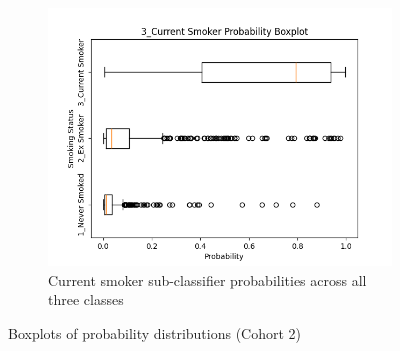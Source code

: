 \documentclass{article}
\begin{document}
\begin{figure}
    \begin{subfigure}{0.48\textwidth}
        \centering
        \includegraphics[width=\linewidth]{cohort2_3_boxplot.png}
        \caption{Current smoker sub-classifier probabilities across all three classes}
    \end{subfigure}
    \caption{Boxplots of probability distributions (Cohort 2)}
\end{figure}
\end{document}
